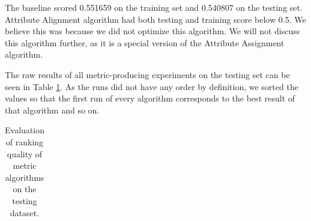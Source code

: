 The baseline scored 0.551659 on the training set and 0.540807 on the testing set. Attribute Alignment algorithm had both testing and training score below 0.5. We believe this was because we did not optimize this algorithm. We will not discuss this algorithm further, as it is a special version of the Attribute Assignment algorithm.

The raw results of all metric-producing experiments on the testing set can be seen in Table \ref{table:metricResults}. As the runs did not have any order by definition, we sorted the values so that the first run of every algorithm corresponds to the best result of that algorithm and so on.

\begin{table}[ht]		
	\centering
	\caption{Evaluation of ranking quality of metric algorithms on the testing dataset.}
	\label{table:metricResults}	
	\begin{tabular}{cllll}


\end{tabular}
\end{table}
